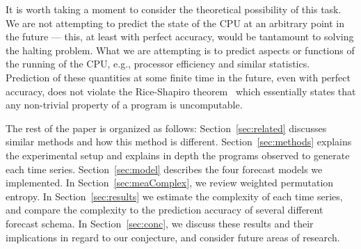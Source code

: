 
It is worth taking a moment to consider the theoretical possibility of
this task. We are not attempting to predict the state of the CPU at an
arbitrary point in the future --- this, at least with perfect
accuracy, would be tantamount to solving the halting problem. What we
are attempting is to predict aspects or functions of the running of
the CPU, e.g., processor efficiency and similar statistics. Prediction of these quantities
at some finite time in the future, even with perfect accuracy, does
not violate the Rice-Shapiro theorem~\cite{hopcroft} which essentially states that any non-trivial property of a program is uncomputable.

 The rest of the paper is organized as follows: Section~\ref{sec:related} discusses similar methods and how this method is different. Section~\ref{sec:methods} explains the experimental setup and explains in depth the programs observed to generate each time series. Section~\ref{sec:model} describes the four forecast models we implemented.  In
 Section~\ref{sec:meaComplex}, we review weighted permutation entropy. In Section~\ref{sec:results} we estimate the complexity of each time series, and
 compare the complexity to the prediction accuracy of several different forecast schema.  In
 Section~\ref{sec:conc}, we discuss these results and their
 implications in regard to our conjecture, and consider future areas of
 research.

